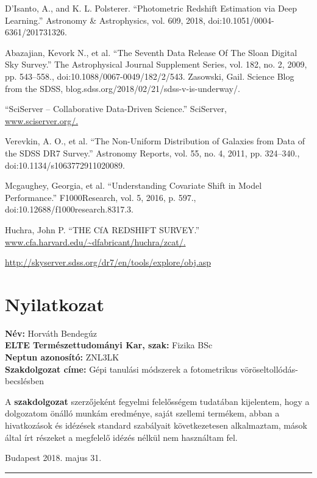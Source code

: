\documentclass[12pt,letterpaper,oneside,openright]{book}
\begin{document}
\begin{thebibliography}{99\kern\bibindent}
D'Isanto, A., and K. L. Polsterer. “Photometric Redshift Estimation via Deep Learning.” Astronomy \&{} Astrophysics, vol. 609, 2018, doi:10.1051/0004-6361/201731326.

Abazajian, Kevork N., et al. “The Seventh Data Release Of The Sloan Digital Sky Survey.” The Astrophysical Journal Supplement Series, vol. 182, no. 2, 2009, pp. 543–558., doi:10.1088/0067-0049/182/2/543.
Zasowski, Gail. Science Blog from the SDSS, blog.sdss.org/2018/02/21/sdss-v-is-underway/.

“SciServer – Collaborative Data-Driven Science.” SciServer, \\\url{www.sciserver.org/.}

Verevkin, A. O., et al. “The Non-Uniform Distribution of Galaxies from Data of the SDSS DR7 Survey.” Astronomy Reports, vol. 55, no. 4, 2011, pp. 324–340., doi:10.1134/s1063772911020089.

Mcgaughey, Georgia, et al. “Understanding Covariate Shift in Model Performance.” F1000Research, vol. 5, 2016, p. 597., doi:10.12688/f1000research.8317.3.

Huchra, John P. “THE CfA REDSHIFT SURVEY.” \\\url{www.cfa.harvard.edu/~dfabricant/huchra/zcat/.}

\url{http://skyserver.sdss.org/dr7/en/tools/explore/obj.asp}

\end{thebibliography}





\chapter*{Nyilatkozat}

\noindent
\textbf{Név:} Horváth Bendegúz
\\
\textbf{ELTE Természettudományi Kar, szak:} Fizika BSc
\\
\textbf{Neptun azonosító:} ZNL3LK\\
\textbf{Szakdolgozat címe:} Gépi tanulási módszerek a fotometrikus vöröseltollódás-becslésben
\vspace*{2cm}    

A    \textbf{szakdolgozat}   szerzőjeként    fegyelmi
felelősségem  tudatában kijelentem,  hogy a  dolgozatom  önálló munkám
eredménye, saját  szellemi termékem, abban a  hivatkozások és idézések
standard  szabályait  következetesen   alkalmaztam,  mások  által  írt
részeket a megfelelő idézés nélkül nem használtam fel.

\vspace*{2cm}
Budapest 2018. majus 31.
\\
\hspace*{8 cm}\rule{5cm}{0.5pt}
\end{document}
